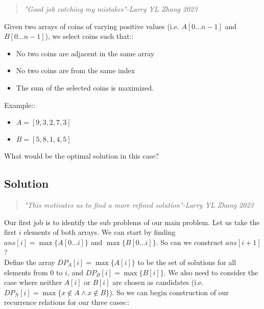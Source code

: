 \documentclass[12pt]{book}
\begin{document}
\begin{quote}
    \textit{"Good job catching my mistakes"-Larry YL Zhang 2023}
\end{quote}

Given two arrays of coins of varying positive values (i.e. $A[0\ldots n-1]$ and $B[0\ldots n-1]$), we select coins such that::
\begin{itemize}
    \item No two coins are adjacent in the same array
    \item No two coins are from the same index
    \item The sum of the selected coins is maximized.
\end{itemize}

Example::

\begin{itemize}
    \item $A=\left[9,3,2,7,3\right]$
    \item $B=\left[5,8,1,4,5\right]$
\end{itemize}

What would be the optimal solution in this case?

\subsection*{Solution}

\begin{quote}
    \textit{"This motivates us to find a more refined solution"-Larry YL Zhang 2023}
\end{quote}

Our first job is to identify the sub problems of our main problem. Let us take the first $i$ elements of both arrays. We can start by finding $ans[i]=\max\{A[0\ldots i]\}$ and $\max\{B[0\ldots i]\}$. So can we construct $ans[i+1]$? \\Define the array $DP_A[i]=\max\{A[i]\}$ to be the set of solutions for all elements from $0$ to $i$, and $DP_B[i]=\max\{B[i]\}$. We also need to consider the case where neither $A[i]$ or $B[i]$ are chosen as candidates (i.e. $DP_N[i]=\max\{x\notin A\land x\notin B\}$). So we can begin construction of our recurrence relations for our three cases::
\end{document}
